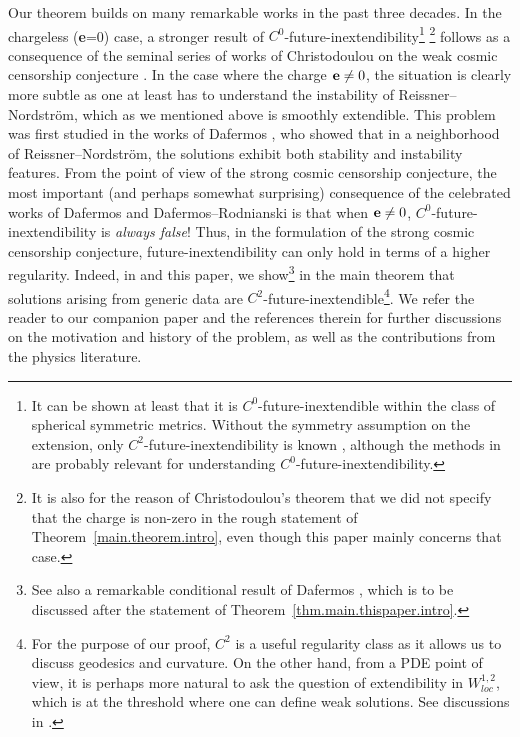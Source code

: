 \documentclass[10pt, reqno]{amsart}
\theoremstyle{definition}
\theoremstyle{remark}
\theoremstyle{conjecture}
\numberwithin{equation}{section}
\newcommand{\0}{\emptyset}
\begin{document}
Our theorem builds on many remarkable works in the past three decades. In the chargeless ({\bf e}=0) case, a stronger result of $C^0$-future-inextendibility\footnote{It can be shown at least that it is $C^0$-future-inextendible within the class of spherical symmetric metrics. Without the symmetry assumption on the extension, only $C^2$-future-inextendibility is known \cite{Kommemi}, although the methods in \cite{Sbie.C0} are probably relevant for understanding $C^0$-future-inextendibility.} \footnote{It is also for the reason of Christodoulou's theorem that we did not specify that the charge is non-zero in the rough statement of Theorem~\ref{main.theorem.intro}, even though this paper mainly concerns that case.} follows as a consequence of the seminal series of works of Christodoulou on the weak cosmic censorship conjecture \cite{Chr.instab, Christodoulou:1991yfa}. In the case where the charge ${\bf e}\neq 0$, the situation is clearly more subtle as one at least has to understand the instability of Reissner--Nordstr\"om, which as we mentioned above is smoothly extendible. This problem was first studied in the works of Dafermos \cite{D1, D2}, who showed that in a neighborhood of Reissner--Nordstr\"om, the solutions exhibit both stability and instability features. From the point of view of the strong cosmic censorship conjecture, the most important (and perhaps somewhat surprising) consequence of the celebrated works of Dafermos \cite{D2} and Dafermos--Rodnianski \cite{DRPL} is that when ${\bf e}\neq 0$, $C^0$-future-inextendibility is \emph{always false}! Thus, in the formulation of the strong cosmic censorship conjecture, future-inextendibility can only hold in terms of a higher regularity. Indeed, in \cite{LO.interior} and this paper, we show\footnote{See also a remarkable conditional result of Dafermos \cite{D2}, which is to be discussed after the statement of Theorem~\ref{thm.main.thispaper.intro}.} in the main theorem that solutions arising from generic data are $C^2$-future-inextendible\footnote{For the purpose of our proof, $C^2$ is a useful regularity class as it allows us to discuss geodesics and curvature. On the other hand, from a PDE point of view, it is perhaps more natural to ask the question of extendibility in $W^{1,2}_{loc}$, which is at the threshold where one can define weak solutions. See discussions in \cite{Chr, D3, LO.interior}.}. We refer the reader to our companion paper \cite{LO.interior} and the references therein for further discussions on the motivation and history of the problem, as well as the contributions from the physics literature.
\end{document}
